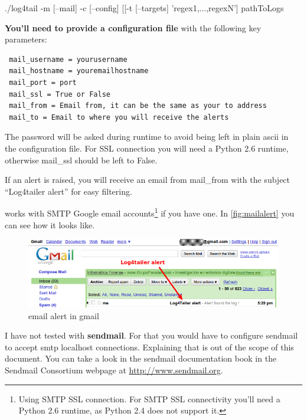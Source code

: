 \begin{cmd}
 ./log4tail -m [--mail] -c [--config] [[-t [--targets] 'regex1,...,regexN'] pathToLogs
\end{cmd}

\textbf{You'll need to provide a configuration file} with the following key parameters:

\begin{config}
\begin{verbatim}
 mail_username = yourusername
 mail_hostname = youremailhostname 
 mail_port = port
 mail_ssl = True or False
 mail_from = Email from, it can be the same as your to address 
 mail_to = Email to where you will receive the alerts
\end{verbatim}
\end{config}

\noindent
The password will be asked during runtime to avoid being left in plain ascii in
the configuration file. For SSL connection you will need a Python 2.6 runtime,
otherwise mail\_ssl should be left to False.

If an alert is raised, you will receive an email from mail\_from with the
subject ``Log4tailer alert'' for easy filtering.

\logftailer{} works with SMTP Google email accounts\footnote{Using SMTP SSL
connection. For SMTP SSL connectivity you'll need a Python 2.6 runtime, as
Python 2.4 does not support it.} if you have one.  In \autoref{fig:mailalert}
you can see how it looks like.

\begin{figure}[hb]
\includegraphics[scale=0.55]{emailalert.png}
\caption{\logftailer{} email alert in gmail}\label{fig:mailalert}
\end{figure}

I have not tested \logftailer{} with \textbf{sendmail}. For that you would have
to configure sendmail to accept smtp localhost connections.  Explaining that is
out of the scope of this document. You can take a look in the sendmail
documentation book in the Sendmail Consortium webpage at
\href{http://www.sendmail.org}{http://www.sendmail.org}.

